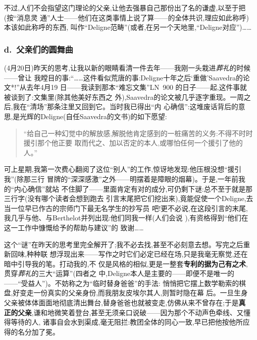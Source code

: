 不过,人们不会指望这门理论的父亲,让他去强暴自己那份出了名的谦虚,以至于把(按“消息灵
通”人士——他们在这类事情上说了算——的全体共识,理应如此称呼)本该如此称呼的东西,
叫作“Deligne范畴”(或者,在另一个天地里,“Deligne对应”)……

\subsubsection{d.\ 父亲们的圆舞曲}


(4月20日)昨天的思考,让我以新的眼睛看清一件去年——我刚一头栽进\emph{葬礼}的时候——曾让
我瞠目的事:“……这件看似荒唐的事:Deligne十年之后‘重做’Saavedra的论文*!”从去年4月19
日——我读到那本“难忘文集”LN~900 的日子——起,这件事就被谈到了:文集里(除其他美好东西之
外),Saavedra的论文被几乎逐字重现。一周之后,我在“清场”那条注里又回到它。当时我已得出“内
心确信”:这堆废话背后的意思,是光辉的Deligne(自任Saavedra的文书)的如下愿望:
\begin{quote}
“给自己一种幻觉中的解放感,解脱他肯定感到的一桩痛苦的义务:不得不时时援引那个他正要
取而代之、加以否定的本人,或哪怕任何一个援引了他的人。”
\end{quote}
可上星期,我第一次费心翻阅了这位“别人”的工作,惊讶地发现:他压根\dmark{}没想“援引我”(除那三行
冒牌的“深深感激”之外——明摆着是障眼的烟幕)。于是,一年前我的“内心确信”就站
不住脚了——里面肯定有对的成分,可仍剩下谜:总不至于就是那三行字(没有哪个读者会想到跑去
引言末尾把它们挖出来),竟能促使一个Deligne,去当一位早已作古的宗师门下最无名学生的抄写员
吧!更不必说,在这段引言的末尾,我几乎与他、与Berthelot并列出现:他们同我一样(人们会说
),有资格得到“他们在这一工作中慷慨给予的帮助与建议”的
致谢……

这个“谜”在昨天的思考里完全解开了;我不必去找,甚至不必刻意去想。写完之后重新回味,种种联
想浮现出来——写作之时它们必定已经在场,只是我毫无察觉,还在暗中引导我的笔。打动我的,不
仅是风格的相似,更是一整套\textbf{专利的据为己有之术},贯穿\emph{葬礼}的三大“运算”(四者之
中,Deligne本人是主要的——即便不是唯一的——“受益人”)。不妨称之为“临时替身爸爸”的手法:
悄悄把它摆上数学勒索的棋盘,好变走一份真实的父亲身份,而我朋友皮埃尔其人,则暂时隐在幕
后。一旦生身父亲被体体面面地彻底清出舞台,替身爸爸也就被变走,仿佛从来不曾存在;于是\textbf{真
正的父亲},谦和地微笑着登台,甚至无须亲口说破——因为那个不动声色牵线、又懂得等待的人,
诸事自会水到渠成,毫无阻拦:教团全体的同心一致,早已把他按他所应得的名分加了冕。

